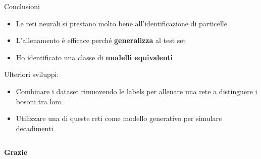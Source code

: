 \documentclass{beamer}
\begin{document}
\begin{frame}{Conclusioni}
  \begin{itemize}
    \item Le reti neurali si prestano molto bene all'identificazione di particelle
    \item L'allenamento è efficace perché \textbf{generalizza} al test set
    \item Ho identificato una classe di \textbf{modelli equivalenti}
  \end{itemize}
  \vspace{2ex}

  Ulteriori sviluppi: 
  \begin{itemize}
    \item Combinare i dataset rimuovendo le labels per allenare una rete a distinguere i bosoni tra loro
    \item Utilizzare una di queste reti come modello generativo per simulare decadimenti
  \end{itemize}
%
  \begin{columns}
    {
      \begin{block}{}
        \centering\vspace*{.5ex}
        \Large\bfseries
        \color{white}
        Grazie%
        \vspace*{.5ex}
      \end{block}
    }
  \end{columns}
\end{frame}
\end{document}
